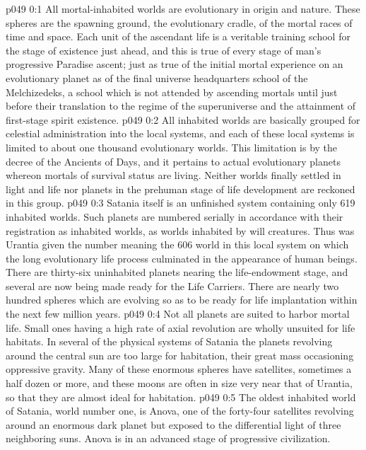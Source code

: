 \author{Melchizedek}
\vs p049 0:1 All mortal\hyp{}inhabited worlds are evolutionary in origin and nature. These spheres are the spawning ground, the evolutionary cradle, of the mortal races of time and space. Each unit of the ascendant life is a veritable training school for the stage of existence just ahead, and this is true of every stage of man’s progressive Paradise ascent; just as true of the initial mortal experience on an evolutionary planet as of the final universe headquarters school of the Melchizedeks, a school which is not attended by ascending mortals until just before their translation to the regime of the superuniverse and the attainment of first\hyp{}stage spirit existence.
\pc \vs p049 0:2 All inhabited worlds are basically grouped for celestial administration into the local systems, and each of these local systems is limited to about one thousand evolutionary worlds. This limitation is by the decree of the Ancients of Days, and it pertains to actual evolutionary planets whereon mortals of survival status are living. Neither worlds finally settled in light and life nor planets in the prehuman stage of life development are reckoned in this group.
\pc \vs p049 0:3 Satania itself is an unfinished system containing only 619 inhabited worlds. Such planets are numbered serially in accordance with their registration as inhabited worlds, as worlds inhabited by will creatures. Thus was Urantia given the number  meaning the 606 world in this local system on which the long evolutionary life process culminated in the appearance of human beings. There are thirty\hyp{}six uninhabited planets nearing the life\hyp{}endowment stage, and several are now being made ready for the Life Carriers. There are nearly two hundred spheres which are evolving so as to be ready for life implantation within the next few million years.\plusone
\vs p049 0:4 Not all planets are suited to harbor mortal life. Small ones having a high rate of axial revolution are wholly unsuited for life habitats. In several of the physical systems of Satania the planets revolving around the central sun are too large for habitation, their great mass occasioning oppressive gravity. Many of these enormous spheres have satellites, sometimes a half dozen or more, and these moons are often in size very near that of Urantia, so that they are almost ideal for habitation.
\vs p049 0:5 The oldest inhabited world of Satania, world number one, is Anova, one of the forty\hyp{}four satellites revolving around an enormous dark planet but exposed to the differential light of three neighboring suns. Anova is in an advanced stage of progressive civilization.
